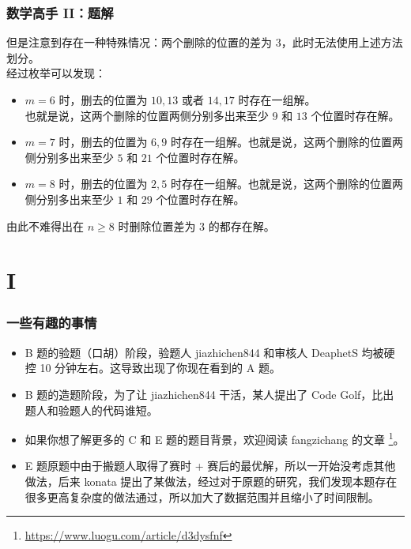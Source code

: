 \documentclass{beamer}
\begin{document}
\begin{frame}
\frametitle{数学高手 II：题解}
但是注意到存在一种特殊情况：两个删除的位置的差为 $3$，此时无法使用上述方法划分。\\
\pause
经过枚举可以发现：
\begin{itemize}
\item $m=6$ 时，删去的位置为 $10,13$ 或者 $14,17$ 时存在一组解。\\
\pause
也就是说，这两个删除的位置两侧分别多出来至少 $9$ 和 $13$ 个位置时存在解。
\pause
\item $m=7$ 时，删去的位置为 $6,9$ 时存在一组解。也就是说，这两个删除的位置两侧分别多出来至少 $5$ 和 $21$ 个位置时存在解。
\pause
\item $m=8$ 时，删去的位置为 $2,5$ 时存在一组解。也就是说，这两个删除的位置两侧分别多出来至少 $1$ 和 $29$ 个位置时存在解。
\end{itemize}
\pause
由此不难得出在 $n \geq 8$ 时删除位置差为 $3$ 的都存在解。
\end{frame}

\section{I}

\begin{frame}
\frametitle{一些有趣的事情}
\begin{itemize}
\item B 题的验题（口胡）阶段，验题人 jiazhichen844 和审核人 DeaphetS 均被硬控 10 分钟左右。这导致出现了你现在看到的 A 题。\\
\pause
\item  B 题的造题阶段，为了让 jiazhichen844 干活，某人提出了 Code Golf，比出题人和验题人的代码谁短。\\
\pause
\item  如果你想了解更多的 C 和 E 题的题目背景，欢迎阅读 fangzichang 的文章 \footnote{\url{https://www.luogu.com/article/d3dysfnf}}。\\
\pause
\item  E 题原题中由于搬题人取得了赛时 + 赛后的最优解，所以一开始没考虑其他做法，后来 konata 提出了某做法，经过对于原题的研究，我们发现本题存在很多更高复杂度的做法通过，所以加大了数据范围并且缩小了时间限制。
\end{itemize}
\end{frame}
\end{document}
